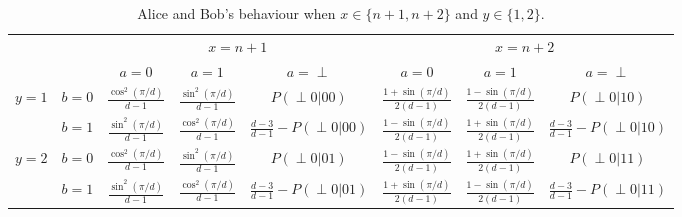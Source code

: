 \documentclass[11pt,letterpaper]{article}
\newcommand{\1}{\mathbb{1}}
\newcommand{\pr}[2]{P(#1|#2)}
\theoremstyle{definition}
\begin{document}
\begin{table}[H]
\begin{center}
\begin{tabular}{|c|c||c|c|c|c|c|c|}
\hline
\multicolumn{2}{|c|}{} &
\multicolumn{3}{|c|}{$x=n+1$}&
\multicolumn{3}{|c|}{$x=n+2$} \\
\cline{3-8}
\multicolumn{2}{|c|}{} &
$a = 0$ & $a=1$ & $a=\perp$ &
$a = 0$ & $a=1$ & $a=\perp$\\
\hline
\hline
\multirow{2}{*}{$y = 1$} & $b=0$ & $\frac{\cos^2(\pi/d)}{d-1}$ & $\frac{\sin^2(\pi/d)}{d-1}$ & \small $\pr{\perp0}{00}$ 
& $\frac{1+\sin(\pi/d)}{2(d-1)}$ & $\frac{1-\sin(\pi/d)}{2(d-1)}$ & \small  $\pr{\perp0}{10}$ \\
\cline{2-8}
&$b=1$ & $\frac{\sin^2(\pi/d)}{d-1}$ & $\frac{\cos^2(\pi/d)}{d-1}$ & $\frac{d-3}{d-1}-\pr{\perp0}{00}$ 
&  $\frac{1-\sin(\pi/d)}{2(d-1)}$ & $\frac{1+\sin(\pi/d)}{2(d-1)}$ & \small $\frac{d-3}{d-1} - \pr{\perp0}{10}$  \\
\hline
\multirow{2}{*}{$y = 2$} & $b=0$ & $\frac{\cos^2(\pi/d)}{d-1}$ & $\frac{\sin^2(\pi/d)}{d-1}$ & \small $\pr{\perp0}{01}$ & 
$ \frac{1-\sin(\pi/d)}{2(d-1)}$ & $ \frac{1+\sin(\pi/d)}{2(d-1)}$ & \small $\pr{\perp 0}{11}$  \\
\cline{2-8}
&$b=1$ & $\frac{\sin^2(\pi/d)}{d-1}$ & $\frac{\cos^2(\pi/d)}{d-1}$ & \small $\frac{d-3}{d-1}-\pr{\perp0}{01}$ &  
$ \frac{1+\sin(\pi/d)}{2(d-1)}$ & $ \frac{1-\sin(\pi/d)}{2(d-1)}$ & \small $\frac{d-3}{d-1}- \pr{\perp 0}{11}$ \\
\hline
\end{tabular}
\end{center}
\caption{Alice and Bob's behaviour when $x \in \{n+1, n+2\}$ and $y \in \{1,2\}$.}
\label{tb:chsh}
\end{table}
\end{document}
